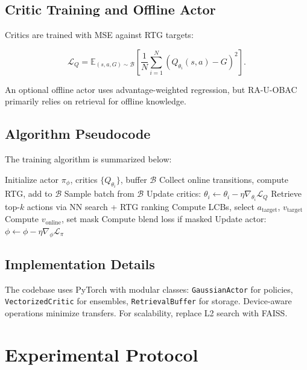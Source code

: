 \documentclass[11pt,a4paper]{article}
\begin{document}
\subsection{Critic Training and Offline Actor}
\label{subsec:critic}

Critics are trained with MSE against RTG targets:

\begin{equation}
\mathcal{L}_Q = \mathbb{E}_{(s,a,G) \sim \mathcal{B}} \left[ \frac{1}{N} \sum_{i=1}^N (Q_{\theta_i}(s,a) - G)^2 \right].
\end{equation}

An optional offline actor uses advantage-weighted regression, but RA-U-OBAC primarily relies on retrieval for offline knowledge.

\subsection{Algorithm Pseudocode}
\label{subsec:pseudocode}

The training algorithm is summarized below:

\begin{algorithmic}[1]
\State Initialize actor $\pi_\phi$, critics $\{Q_{\theta_i}\}$, buffer $\mathcal{B}$
  \State Collect online transitions, compute RTG, add to $\mathcal{B}$
  \State Sample batch from $\mathcal{B}$
  \State Update critics: $\theta_i \leftarrow \theta_i - \eta \nabla_{\theta_i} \mathcal{L}_Q$
    \State Retrieve top-$k$ actions via NN search + RTG ranking
    \State Compute LCBs, select $a_{\mathrm{target}}$, $v_{\mathrm{target}}$
    \State Compute $v_{\mathrm{online}}$, set mask
    \State Compute blend loss if masked
  \EndFor
  \State Update actor: $\phi \leftarrow \phi - \eta \nabla_\phi \mathcal{L}_\pi$
\EndFor
\end{algorithmic}

\subsection{Implementation Details}
\label{subsec:implementation}

The codebase uses PyTorch with modular classes: \texttt{GaussianActor} for policies, \texttt{VectorizedCritic} for ensembles, \texttt{RetrievalBuffer} for storage. Device-aware operations minimize transfers. For scalability, replace L2 search with FAISS.

\section{Experimental Protocol}
\label{sec:experiments}
\end{document}
